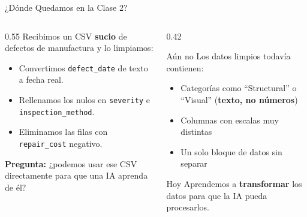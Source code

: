 \documentclass[aspectratio=169]{beamer}
\newcommand{\tech}[1]{\texttt{\textcolor{mainColor}{#1}}}
\begin{document}
\begin{frame}{¿Dónde Quedamos en la Clase 2?}
  \begin{columns}[T]
    \begin{column}{0.55\textwidth}
      \small
      Recibimos un CSV \textbf{sucio} de defectos de manufactura y lo limpiamos:
      \vspace{0.15cm}
      \begin{itemize}\setlength\itemsep{4pt}
        \item Convertimos \tech{defect\_date} de texto a fecha real.
        \item Rellenamos los nulos en \tech{severity} e \tech{inspection\_method}.
        \item Eliminamos las filas con \tech{repair\_cost} negativo.
      \end{itemize}

      \vspace{0.3cm}
      \textbf{Pregunta:} ¿podemos usar ese CSV directamente para que una IA aprenda de él?
    \end{column}
    \begin{column}{0.42\textwidth}
      \begin{alertblock}{\faExclamationTriangle\enspace Aún no}
        \small
        Los datos limpios todavía contienen:
        \begin{itemize}\setlength\itemsep{2pt}
          \item Categorías como ``Structural'' o ``Visual'' (\textbf{texto, no números})
          \item Columnas con escalas muy distintas
          \item Un solo bloque de datos sin separar
        \end{itemize}
      \end{alertblock}
      \vspace{0.15cm}
      \begin{conceptbox}{\faArrowRight\enspace Hoy}
        \small\centering
        Aprendemos a \textbf{transformar} los datos para que la IA pueda procesarlos.
      \end{conceptbox}
    \end{column}
  \end{columns}
\end{frame}

\end{document}
